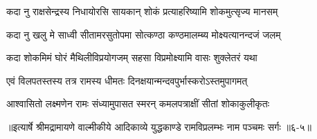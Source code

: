 \twolineshloka
{कदा नु राक्षसेन्द्रस्य निधायोरसि सायकान्}
{शोकं प्रत्याहरिष्यामि शोकमुत्सृज्य मानसम्} %

\twolineshloka
{कदा नु खलु मे साध्वी सीतामरसुतोपमा}
{सोत्कण्ठा कण्ठमालम्ब्य मोक्ष्यत्यानन्दजं जलम्} %

\twolineshloka
{कदा शोकमिमं घोरं मैथिलीविप्रयोगजम्}
{सहसा विप्रमोक्ष्यामि वासः शुक्लेतरं यथा} %

\twolineshloka
{एवं विलपतस्तस्य तत्र रामस्य धीमतः}
{दिनक्षयान्मन्दवपुर्भास्करोऽस्तमुपागमत्} %

\twolineshloka
{आश्वासितो लक्ष्मणेन रामः संध्यामुपासत}
{स्मरन् कमलपत्राक्षीं सीतां शोकाकुलीकृतः} %


॥इत्यार्षे श्रीमद्रामायणे वाल्मीकीये आदिकाव्ये युद्धकाण्डे रामविप्रलम्भः नाम पञ्चमः सर्गः ॥६-५॥
